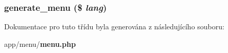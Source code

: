 \subsubsection[{generate\_\-menu}]{\setlength{\rightskip}{0pt plus 5cm}generate\_\-menu (\$ {\em lang})}\label{d7/d3d/classmenu_a00992e58943171e1d5f20b592620ea66}


Dokumentace pro tuto třídu byla generována z následujícího souboru:\begin{DoxyCompactItemize}
\item 
app/menu/{\bf menu.php}\end{DoxyCompactItemize}
